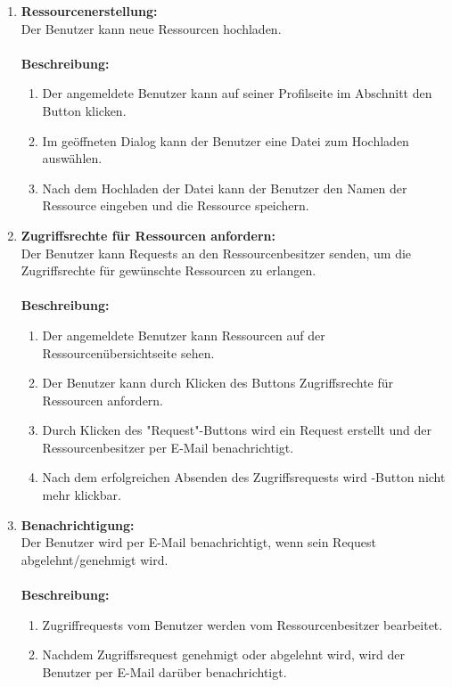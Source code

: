 \documentclass[parskip=full,11pt]{scrartcl}
\def\threedigits#1{%
  \ifnum#1<10 0\fi
  \ifnum#1<1 0\fi
  \number#1}
\begin{document}
\begin{enumerate}[label={\textbf{/F\protect\threedigits{\theenumi}0/}}, leftmargin=*]
\item \label{FAB4} \textbf{Ressourcenerstellung:}\\ Der Benutzer kann neue Ressourcen hochladen.\\\\
\textbf{Beschreibung:}\\
\begin{enumerate}[label=(\arabic*), leftmargin=*]
\item Der angemeldete Benutzer kann auf seiner Profilseite im Abschnitt \grqq \: den Button \grqq \: klicken.
\item Im geöffneten Dialog kann der Benutzer eine Datei zum Hochladen auswählen.
\item Nach dem Hochladen der Datei kann der Benutzer den Namen der Ressource eingeben und die Ressource speichern.  
\end{enumerate}

\item \label{FAB5} \textbf{Zugriffsrechte für Ressourcen anfordern:}\\ Der Benutzer kann Requests an den Ressourcenbesitzer senden, um die Zugriffsrechte für gewünschte Ressourcen zu erlangen.\\\\
\textbf{Beschreibung:}\\
\begin{enumerate}[label=(\arabic*), leftmargin=*]
\item Der angemeldete Benutzer kann Ressourcen auf der Ressourcenübersichtseite sehen.
\item Der Benutzer kann durch Klicken des Buttons \grqq \: Zugriffsrechte für Ressourcen anfordern.
\item Durch Klicken des "Request"-Buttons wird ein Request erstellt und der Ressourcenbesitzer per E-Mail benachrichtigt.
\item Nach dem erfolgreichen Absenden des Zugriffsrequests wird  \grqq -Button nicht mehr klickbar.
\end{enumerate}
\newpage

\item \label{FAB6} \textbf{Benachrichtigung:}\\ Der Benutzer wird per E-Mail benachrichtigt, wenn sein Request abgelehnt/genehmigt wird.\\\\
\textbf{Beschreibung:}\\
\begin{enumerate}[label=(\arabic*), leftmargin=*]
\item Zugriffrequests vom Benutzer werden vom Ressourcenbesitzer bearbeitet.
\item Nachdem Zugriffsrequest genehmigt oder abgelehnt wird, wird der Benutzer per E-Mail darüber benachrichtigt.
\end{enumerate} 


\end{enumerate}
\end{document}
